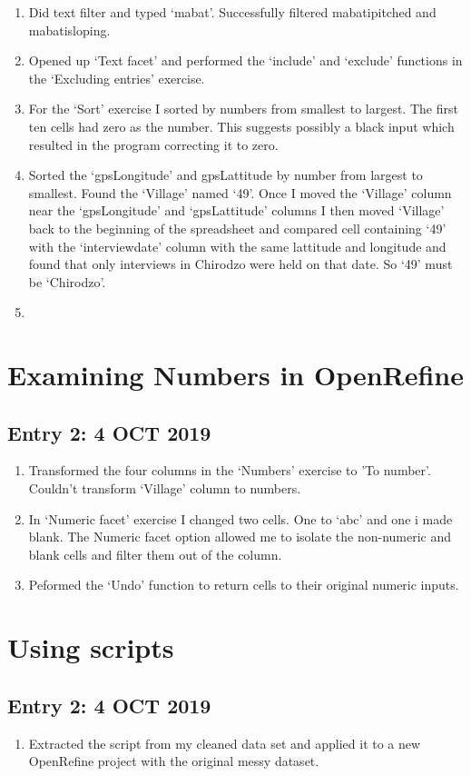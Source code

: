 \documentclass{article}
\begin{document}
\begin{enumerate}
    \item Did text filter and typed `mabat'. Successfully filtered mabatipitched and mabatisloping.
    \item Opened up `Text facet' and performed the `include' and `exclude' functions in the `Excluding entries' exercise.
    \item For the `Sort' exercise I sorted by numbers from smallest to largest. The first ten cells had zero as the number. This suggests possibly a black input which resulted in the program correcting it to zero.
    \item Sorted the `gps\textunderscore Longitude' and gps\textunderscore Lattitude by number from largest to smallest. Found the `Village' named `49'. Once I moved the `Village' column near the `gps\textunderscore Longitude' and `gps\textunderscore Lattitude' columns I then moved `Village' back to the beginning of the spreadsheet and compared cell containing `49' with the `interview\textunderscore date' column with the same lattitude and longitude and found that only interviews in Chirodzo were held on that date. So `49' must be `Chirodzo'.
    \item 
\end{enumerate}

\section{Examining Numbers in OpenRefine}

\subsection{Entry 2: 4 OCT 2019}

\begin{enumerate}
    \item Transformed the four columns in the `Numbers' exercise to 'To number'. Couldn't transform `Village' column to numbers.
    \item In `Numeric facet' exercise I changed two cells. One to `abc' and one i made blank. The Numeric facet option allowed me to isolate the non-numeric and blank cells and filter them out of the column.
    \item Peformed the `Undo' function to return cells to their original numeric inputs.
\end{enumerate}

\section{Using scripts}

\subsection{Entry 2: 4 OCT 2019}

\begin{enumerate}
    \item Extracted the script from my cleaned data set and applied it to a new OpenRefine project with the original messy dataset.
\end{enumerate}
\end{document}
